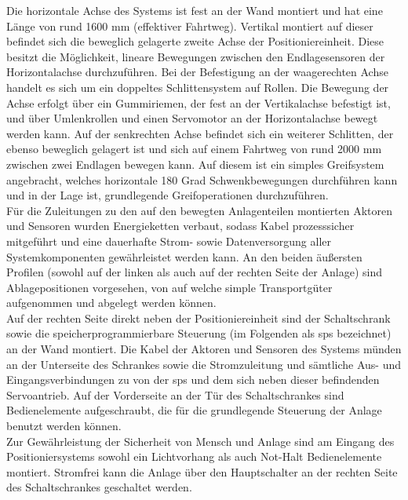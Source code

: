 \documentclass[../../../Bachelorarbeit.tex]{subfiles}
\begin{document}
Die horizontale Achse des Systems ist fest an der Wand montiert und hat eine Länge von rund 1600 \si{mm} (effektiver Fahrtweg). Vertikal montiert auf dieser befindet sich die beweglich gelagerte zweite Achse der Positioniereinheit. Diese besitzt die Möglichkeit, lineare Bewegungen zwischen den Endlagesensoren der Horizontalachse durchzuführen. Bei der Befestigung an der waagerechten Achse handelt es sich um ein doppeltes Schlittensystem auf Rollen. Die Bewegung der Achse erfolgt über ein Gummiriemen, der fest an der Vertikalachse befestigt ist, und über Umlenkrollen und einen Servomotor an der Horizontalachse bewegt werden kann. Auf der senkrechten Achse befindet sich ein weiterer Schlitten, der ebenso beweglich gelagert ist und sich auf einem Fahrtweg von rund 2000 \si{mm} zwischen zwei Endlagen bewegen kann. Auf diesem ist ein simples Greifsystem angebracht, welches horizontale 180 Grad Schwenkbewegungen durchführen kann und in der Lage ist, grundlegende Greifoperationen durchzuführen.\\
Für die Zuleitungen zu den auf den bewegten Anlagenteilen montierten Aktoren und Sensoren wurden Energieketten verbaut, sodass Kabel prozesssicher mitgeführt und eine dauerhafte Strom- sowie Datenversorgung aller Systemkomponenten gewährleistet werden kann. An den beiden äußersten Profilen (sowohl auf der linken als auch auf der rechten Seite der Anlage) sind Ablagepositionen vorgesehen, von \bzw auf welche simple Transportgüter aufgenommen und abgelegt werden können.\\
Auf der rechten Seite direkt neben der Positioniereinheit sind der Schaltschrank sowie die speicherprogrammierbare Steuerung (im Folgenden als \acs{sps} bezeichnet) an der Wand montiert. Die Kabel der Aktoren und Sensoren des Systems münden an der Unterseite des Schrankes sowie die Stromzuleitung und sämtliche Aus- und Eingangsverbindungen zu \bzw von der \acs{sps} und dem sich neben dieser befindenden Servoantrieb. Auf der Vorderseite an der Tür des Schaltschrankes sind Bedienelemente aufgeschraubt, die für die grundlegende Steuerung der Anlage benutzt werden können.\\
Zur Gewährleistung der Sicherheit von Mensch und Anlage sind am Eingang des Positioniersystems sowohl ein Lichtvorhang als auch Not-Halt Bedienelemente montiert. Stromfrei kann die Anlage über den Hauptschalter an der rechten Seite des Schaltschrankes geschaltet werden.
\end{document}
